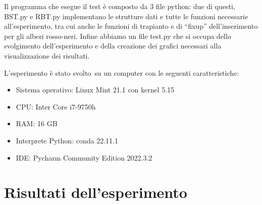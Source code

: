 \documentclass[
]{article}
\begin{document}
Il programma che esegue il test è composto da 3 file python: due di
questi, BST.py e RBT.py implementano le strutture dati e tutte le
funzioni necessarie all'esperimento, tra cui anche le funzioni di
trapianto e di ``fixup'' dell'inserimento per gli alberi rosso-neri.
Infine abbiamo un file test.py che si occupa dello svolgimento
dell'esperimento e della creazione dei grafici necessari alla
visualizzazione dei risultati.

L'esperimento è stato svolto~su un computer con le seguenti
caratteristiche:

\begin{itemize}
\item
  Sistema operativo: Linux Mint 21.1 con kernel 5.15
\item
  CPU: Inter Core i7-9750h
\item
  RAM: 16 GB
\item
  Interprete Python: conda 22.11.1
\item
  IDE: Pycharm Community Edition 2022.3.2
\end{itemize}

\hypertarget{risultati-dellesperimento}{%
\section{Risultati dell'esperimento}\label{risultati-dellesperimento}}
\end{document}
